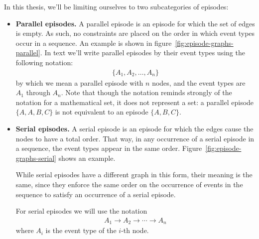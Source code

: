 In this thesis, we'll be limiting ourselves to two subcategories of episodes:
\begin{itemize}
\item \textbf{Parallel episodes.} A parallel episode is an episode for which the set of edges is empty. As such, no constraints are placed on the order in which event types occur in a sequence. An example is shown in figure~\ref{fig:episode-graphs-parallel}. In text we'll write parallel episodes by their event types using the following notation:
\begin{align*}
    \{ A_1, A_2, \ldots, A_n \}
\end{align*}
by which we mean a parallel episode with $ n $ nodes, and the event types are $ A_1 $ through $ A_n $. Note that though the notation reminds strongly of the notation for a mathematical set, it does not represent a set: a parallel episode $ \{ A, A, B, C \} $ is not equivalent to an episode $ \{ A, B, C \} $.

\item \textbf{Serial episodes.} A serial episode is an episode for which the edges cause the nodes to have a total order. That way, in any occurrence of a serial episode in a sequence, the event types appear in the same order. Figure~\ref{fig:episode-graphs-serial} shows an example.


While serial episodes have a different graph in this form, their meaning is the same, since they enforce the same order on the occurrence of events in the sequence to satisfy an occurrence of a serial episode.

For serial episodes we will use the notation
\begin{align*}
A_1 \to A_2 \to \cdots \to A_n
\end{align*}
where $ A_i $ is the event type of the $ i $-th node.

\end{itemize}

